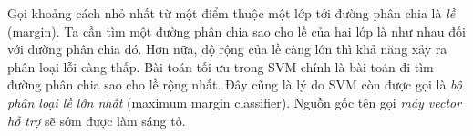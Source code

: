 Gọi khoảng cách nhỏ nhất từ một điểm thuộc một lớp tới đường phân chia là \textit{lề} (margin). Ta cần tìm một đường phân chia sao cho lề của hai lớp là như nhau đối với đường phân chia đó. Hơn nữa, độ rộng của lề càng lớn thì khả năng xảy ra phân loại lỗi càng thấp. Bài toán tối ưu trong SVM chính là bài toán đi tìm đường phân chia
sao cho lề rộng nhất. Đây cũng là lý do SVM
còn được gọi là \textit{bộ phân loại lề lớn nhất} ({maximum margin classifier}). Nguồn gốc tên gọi
\textit{máy vector hỗ trợ} sẽ sớm được làm sáng tỏ.








